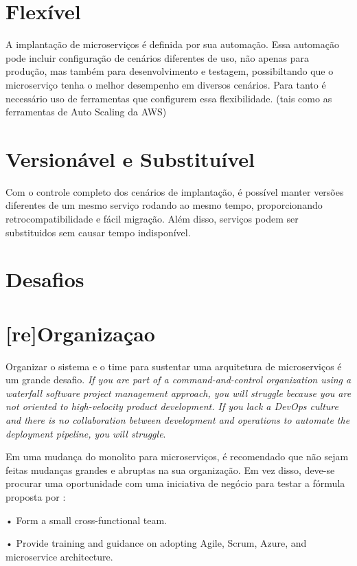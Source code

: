 \section*{Flexível}

A implantação de microserviços é definida por sua automação. Essa automação pode incluir configuração de cenários diferentes de uso, não apenas para produção, mas também para desenvolvimento e testagem, possibiltando que o microserviço tenha o melhor desempenho em diversos cenários. Para tanto é necessário uso de ferramentas que configurem essa flexibilidade. (tais como as ferramentas de Auto Scaling da AWS)

\section*{Versionável e Substituível}

Com o controle completo dos cenários de implantação, é possível manter versões diferentes de um mesmo serviço rodando ao mesmo tempo, proporcionando retrocompatibilidade e fácil migração. Além disso, serviços podem ser substituidos sem causar tempo indisponível.

\section{Desafios}

\section*{[re]Organizaçao}

Organizar o sistema e o time para sustentar uma arquitetura de microserviços é um grande desafio. \emph{If you are part of a command-and-control organization using a waterfall software project management approach, you will struggle because you are not oriented to high-velocity product development. If you lack a DevOps culture and there is no collaboration between development and operations to automate the deployment pipeline, you will struggle}.

Em uma mudança do monolito para microserviços, é recomendado que não sejam feitas mudanças grandes e abruptas na sua organização. Em vez disso, deve-se procurar uma oportunidade com uma iniciativa de negócio para testar a fórmula proposta por  : 

•	 Form a small cross-functional team.

•	 Provide training and guidance on adopting Agile, Scrum, Azure, and microservice architecture.


